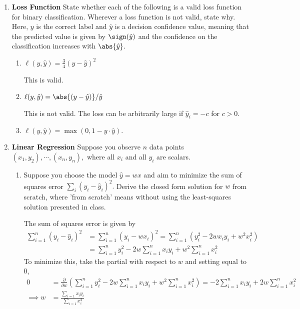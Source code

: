 \documentclass{article}
\begin{document}
\begin{enumerate}[1)]
\begin{enumerate}[1.]
		\end{enumerate}

	\item \textbf{Loss Function} State whether each of the following is a valid loss function for binary classification. Wherever a loss function is not valid, state why. Here, $y$ is the correct label and $\hat y$ is a decision confidence value, meaning that the predicted value is given by $\sign(\hat y)$ and the confidence on the classification increases with $\abs{\hat y}.$
		\begin{enumerate}[1.]
			\item $\ell(y, \hat y)=\frac{3}{4}\left( y-\hat y \right)^2$
				\begin{answer*}
					This is valid.
				\end{answer*}

			\item $\ell(y, \hat y)=\abs{(y-\hat y)}/\hat y$
				\begin{answer*}
					This is not valid. The loss can be arbitrarily large if $\hat y_i=-c$ for $c>0.$
				\end{answer*}
				
			\item $\ell(y, \hat y)=\max(0, 1-y\cdot \hat y).$
				
		\end{enumerate}

	\item \textbf{Linear Regression} Suppose you observe $n$ data points $(x_1, y_2), \cdots, (x_n, y_n),$ where all $x_i$ and all $y_i$ are scalars. 
		\begin{enumerate}[1.]
			\item Suppose you choose the model $\hat y=wx$ and aim to minimize the sum of squares error $\sum_{i}^{}(y_i-\hat y_i)^2.$ Derive the closed form solution for $w$ from scratch, where 'from scratch' means without using the least-squares solution presented in class.
				\begin{soln}
					The sum of squares error is given by
					\begin{align*}
						\sum_{i=1}^{n} (y_i-\hat y_i)^2 &= \sum_{i=1}^{n} (y_i- wx_i)^2 = \sum_{i=1}^{n}(y_i^2-2wx_iy_i+w^2x_i^2) \\
						&= \sum_{i=1}^{n} y_i^2 - 2w\sum_{i=1}^{n} x_iy_i + w^2\sum_{i=1}^{n} x_i^2
					\end{align*}
					To minimize this, take the partial with respect to $w$ and setting equal to 0,
					\begin{align*}
						0&=\frac{\partial}{\partial w} \left( \sum_{i=1}^{n} y_i^2 - 2w\sum_{i=1}^{n} x_iy_i + w^2\sum_{i=1}^{n} x_i^2 \right) = -2\sum_{i=1}^{n} x_iy_i + 2w\sum_{i=1}^{n} x_i^2 \\
						\implies w &= \frac{\sum_{i=1}^{}x_iy_i}{\sum_{i=1}^{} x_i^2}
					\end{align*}
				\end{soln}


\end{enumerate}
\end{enumerate}
\end{document}
